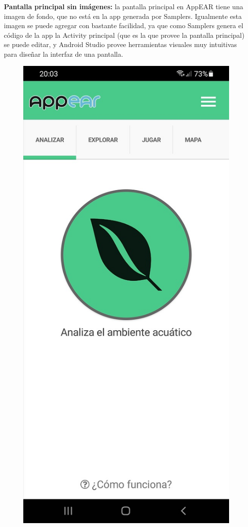 \newpage

\textbf{Pantalla principal sin imágenes:} la pantalla principal en AppEAR tiene una imagen de fondo, que no está en la app generada por Samplers. Igualmente esta imagen se puede agregar con bastante facilidad, ya que como Samplers genera el código de la app la Activity principal (que es la que provee la pantalla principal) se puede editar, y Android Studio provee herramientas visuales muy intuitivas para diseñar la interfaz de una pantalla.

\begin{figure}[H]
  \centering
   \includegraphics[scale=0.3]{06-caso_de_uso/appear_main.jpg} 

\end{figure}
